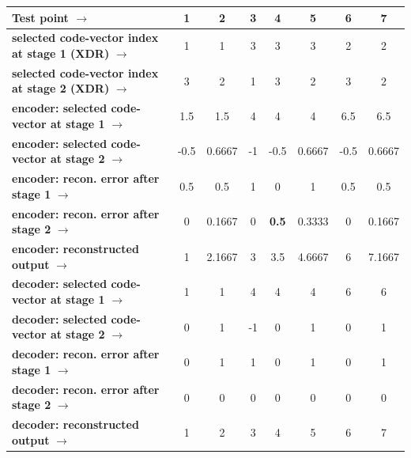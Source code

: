 \begin{table}[t]
\scriptsize
\centering
\begin{tabular}{|l||c|c|c|c|c|c|c|}\hline 
\textbf{Test point} $\rightarrow$                             & \textbf{1}  &\textbf{2} &\textbf{3}   &\textbf{4}   &\textbf{5} &\textbf{6} &\textbf{7} \\\hline
\textbf{selected code-vector index at stage 1 (XDR)} $\rightarrow$ & 1     &  1   &  3   &  3   &  3   &  2     & 2 \\
\textbf{selected code-vector index at stage 2 (XDR)} $\rightarrow$ & 3     & 2     & 1   &  3   &  2   &  3     & 2 \\\hline\hline
\textbf{encoder: selected code-vector at stage 1} $\rightarrow$& 1.5     &1.5           &  4   &  4           &  4             &  6.5     & 6.5 \\
\textbf{encoder: selected code-vector at stage 2} $\rightarrow$& -0.5     & 0.6667     & -1   &  -0.5       &  0.6667   &  -0.5     & 0.6667 \\\hline
\textbf{encoder: recon. error after stage 1} $\rightarrow$& \color{blue}0.5  & \color{blue}0.5   &  \color{blue}1     &   0   &   \color{blue}1   &   \color{blue}0.5 & \color{blue}0.5 \\
\textbf{encoder: recon. error after stage 2} $\rightarrow$ & 0   &  \color{darkgreen}0.1667     &  0   &\color{darkgreen}\textbf{0.5}&   \color{darkgreen}0.3333    &   0   & \color{darkgreen}0.1667 \\\hline
\textbf{encoder: reconstructed output} $\rightarrow$             & 1         & 2.1667     & 3   & 3.5         &  4.6667   &  6         & 7.1667 \\\hline\hline
\textbf{decoder: selected code-vector at stage 1} $\rightarrow$& 1     &1           &  4   &  4           &  4             &  6     & 6 \\
\textbf{decoder: selected code-vector at stage 2} $\rightarrow$& 0     & 1     & -1   &  0       &  1   &  0     & 1 \\\hline
\textbf{decoder: recon. error after stage 1} $\rightarrow$        & 0       & 1     & 1   & 0         &  1   &  0         & 1 \\
\textbf{decoder: recon. error after stage 2} $\rightarrow$        & 0       & 0     & 0   & 0         &  0   &  0         & 0 \\\hline
\textbf{decoder: reconstructed output} $\rightarrow$             & 1         & 2     & 3   & 4         &  5   &  6         & 7 \\\hline

\end{tabular}
\end{table}
